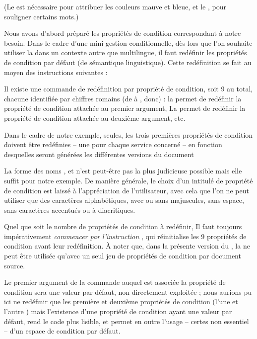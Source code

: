 \documentclass{article}
\begin{document}
(Le  est nécessaire pour attribuer les couleurs mauve et bleue, et le , pour souligner certains mots.)

\tutostep
Nous avons d'abord préparé les propriétés de condition correspondant à notre besoin. Dans le cadre d'une mini-gestion conditionnelle, dès lors que l'on souhaite utiliser la  dans un contexte autre que multilingue, il faut redéfinir les propriétés de condition par défaut (de sémantique linguistique). Cette redéfinition se fait au moyen des instructions suivantes :

\begin{codeblock}
\end{codeblock}

Il existe une commande de redéfinition par propriété de condition, soit 9 au total, chacune identifiée par chiffres romains (de  à , donc) : la  permet de redéfinir la propriété de condition attachée au premier argument, La  permet de redéfinir la propriété de condition attachée au deuxième argument, etc.

Dans le cadre de notre exemple, seules, les trois premières propriétés de condition doivent être redéfinies -- une pour chaque service concerné -- en fonction desquelles seront générées les différentes versions du document

La forme des noms ,  et  n'est peut-être pas la plus judicieuse possible mais elle suffit pour notre exemple. De manière générale, le choix d'un intitulé de propriété de condition est laissé à l'appréciation de l'utilisateur, avec cela que l'on ne peut utiliser que des caractères alphabétiques, avec ou sans majuscules, sans espace, sans caractères accentués ou à diacritiques.

Quel que soit le nombre de propriétés de condition à redéfinir, Il faut toujours impérativement \emph{commencer par l'instruction} , qui réinitialise les 9 propriétés de condition avant leur redéfinition. À noter que, dans la présente version du , la  ne peut être utilisée qu'avec un seul jeu de propriétés de condition par document source.

Le premier argument de la commande  auquel est associée la propriété de condition  sera une valeur par défaut, non directement exploitée ; nous aurions pu ici ne redéfinir que les première et deuxième propriétés de condition (l'une  et l'autre ) mais l'existence d'une propriété de condition ayant une valeur par défaut, rend le code plus lisible, et permet en outre l'usage -- certes non essentiel -- d'un espace de condition par défaut.
\end{document}
